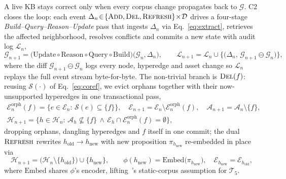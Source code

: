 \documentclass{article}
\begin{document}
A live KB stays correct only when every corpus change propagates back to $\mathcal{G}$. C2 closes the loop: each event $\Delta_n\!\in\!\{\textsc{Add},\textsc{Del},\textsc{Refresh}\}\!\times\!\mathcal{D}$ drives a four-stage \emph{Build--Query--Reason--Update} pass that ingests $\Delta_n$ via Eq.~\eqref{eq:extract}, retrieves the affected neighborhood, resolves conflicts and commits a new state with audit log $\mathcal{L}_n$,
\begin{equation}
\mathcal{G}_{n+1}\!=\!\bigl(\mathrm{Update}\!\circ\!\mathrm{Reason}\!\circ\!\mathrm{Query}\!\circ\!\mathrm{Build}\bigr)\!\bigl(\mathcal{G}_n,\Delta_n\bigr),\qquad
\mathcal{L}_{n+1}\!=\!\mathcal{L}_n\!\cup\!\bigl\{\bigl(\Delta_n,\,\mathcal{G}_{n+1}\!\ominus\!\mathcal{G}_n\bigr)\bigr\},
\label{eq:loop}
\end{equation}
where the diff $\mathcal{G}_{n+1}\!\ominus\!\mathcal{G}_n$ logs every node, hyperedge and asset change so $\mathcal{L}_n$ replays the full event stream byte-for-byte. The non-trivial branch is $\textsc{Del}(f)$: reusing $\mathcal{S}(\cdot)$ of Eq.~\eqref{eq:coref}, we evict orphans together with their now-unsupported hyperedges in one transactional pass,
\begin{equation}
\begin{gathered}
\mathcal{E}_n^{\mathrm{orph}}(f)\!=\!\bigl\{e\!\in\!\mathcal{E}_n\!:\,\mathcal{S}(e)\!\subseteq\!\{f\}\bigr\},\quad
\mathcal{E}_{n+1}\!=\!\mathcal{E}_n\!\setminus\!\mathcal{E}_n^{\mathrm{orph}}(f),\quad
\mathcal{A}_{n+1}\!=\!\mathcal{A}_n\!\setminus\!\{f\},\\[-1pt]
\mathcal{H}_{n+1}\!=\!\bigl\{h\!\in\!\mathcal{H}_n\!:\,\mathcal{A}_h\!\not\subseteq\!\{f\}\,\wedge\,\mathcal{E}_h\!\cap\!\mathcal{E}_n^{\mathrm{orph}}(f)\!=\!\emptyset\bigr\},
\end{gathered}
\label{eq:cascade}
\end{equation}
dropping orphans, dangling hyperedges and $f$ itself in one commit; the dual $\textsc{Refresh}$ rewrites $h_{\mathrm{old}}\!\to\!h_{\mathrm{new}}$ with new proposition $\pi_{h_{\mathrm{new}}}$ re-embedded in place via
\begin{equation}
\mathcal{H}_{n+1}\!=\!\bigl(\mathcal{H}_n\!\setminus\!\{h_{\mathrm{old}}\}\bigr)\!\cup\!\{h_{\mathrm{new}}\},\qquad
\phi(h_{\mathrm{new}})\!=\!\mathrm{Embed}\!\bigl(\pi_{h_{\mathrm{new}}}\bigr),\quad \mathcal{E}_{h_{\mathrm{new}}}\!=\!\mathcal{E}_{h_{\mathrm{old}}},
\label{eq:refresh}
\end{equation}
where $\mathrm{Embed}$ shares $\phi$'s encoder, lifting~\citep{GraphRAG,LightRAG,HippoRAG2,KAG}'s static-corpus assumption for $\mathcal{T}_5$.
\end{document}

